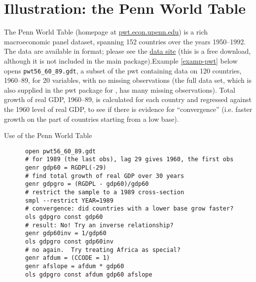 \section{Illustration: the Penn World Table}
\label{PWT}

The Penn World Table (homepage at \href{http://pwt.econ.upenn.edu/}{pwt.econ.upenn.edu})
      is a rich macroeconomic panel dataset, spanning 152 countries
      over the years 1950--1992.  The data are available in
       format; please see the
       \href{http://gretl.sourceforge.net/gretl_data.html}{data
	site} (this is a free download, although it is not
      included in the main 
      package).Example \ref{examp-pwt} below opens
      \verb+pwt56_60_89.gdt+, a subset of the pwt
      containing data on 120 countries, 1960--89, for 20
      variables, with no missing observations (the full data set,
      which is also supplied in the pwt package for
      , has many missing
      observations). Total growth of real GDP, 1960--89, is
      calculated for each country and regressed against the 1960 level
      of real GDP, to see if there is evidence for
      ``convergence'' (i.e. faster growth on the part of
      countries starting from a low base).

\begin{script}[htbp]
\caption{Use of the Penn World Table}
\label{examp-pwt}

\begin{verbatim}
	  open pwt56_60_89.gdt 
	  # for 1989 (the last obs), lag 29 gives 1960, the first obs 
	  genr gdp60 = RGDPL(-29) 
	  # find total growth of real GDP over 30 years
	  genr gdpgro = (RGDPL - gdp60)/gdp60
	  # restrict the sample to a 1989 cross-section 
	  smpl --restrict YEAR=1989 
	  # convergence: did countries with a lower base grow faster?  
	  ols gdpgro const gdp60 
	  # result: No! Try an inverse relationship?
	  genr gdp60inv = 1/gdp60 
	  ols gdpgro const gdp60inv 
	  # no again.  Try treating Africa as special? 
	  genr afdum = (CCODE = 1)
	  genr afslope = afdum * gdp60 
	  ols gdpgro const afdum gdp60 afslope 
      \end{verbatim}
\end{script}



